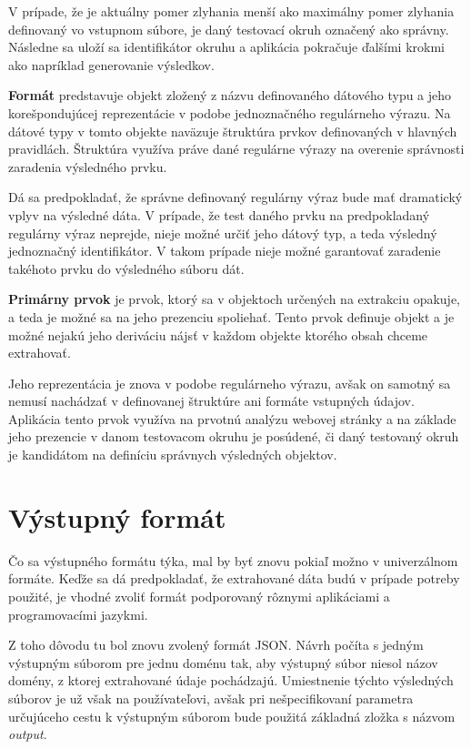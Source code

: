 V prípade, že je aktuálny pomer zlyhania menší ako maximálny pomer zlyhania definovaný vo vstupnom súbore, je daný testovací okruh označený ako správny. Následne sa uloží sa identifikátor okruhu a aplikácia pokračuje ďalšími krokmi ako napríklad generovanie výsledkov.

\bigskip

\textbf{Formát} predstavuje objekt zložený z názvu definovaného dátového typu a jeho korešpondujúcej reprezentácie v podobe jednoznačného regulárneho výrazu. Na dátové typy v tomto objekte naväzuje štruktúra prvkov definovaných v hlavných pravidlách. Štruktúra využíva práve dané regulárne výrazy na overenie správnosti zaradenia výsledného prvku.

Dá sa predpokladať, že správne definovaný regulárny výraz bude mať dramatický vplyv na výsledné dáta. V prípade, že test daného prvku na predpokladaný regulárny výraz neprejde, nieje možné určiť jeho dátový typ, a teda výsledný jednoznačný identifikátor. V takom prípade nieje možné garantovať zaradenie takéhoto prvku do výsledného súboru dát.

\newpage

\textbf{Primárny prvok} je prvok, ktorý sa v objektoch určených na extrakciu opakuje, a teda je možné sa na jeho prezenciu spoliehať. Tento prvok definuje objekt a je možné nejakú jeho deriváciu nájsť v každom objekte ktorého obsah chceme extrahovať. 

Jeho reprezentácia je znova v podobe regulárneho výrazu, avšak on samotný sa nemusí nachádzať v definovanej štruktúre ani formáte vstupných údajov. Aplikácia tento prvok využíva na prvotnú analýzu webovej stránky a na základe jeho prezencie v danom testovacom okruhu je posúdené, či daný testovaný okruh je kandidátom na definíciu správnych výsledných objektov.


\section{Výstupný formát}

Čo sa výstupného formátu týka, mal by byť znovu pokiaľ možno v univerzálnom formáte. Keďže sa dá predpokladať, že extrahované dáta budú v prípade potreby použité, je vhodné zvoliť formát podporovaný rôznymi aplikáciami a programovacími jazykmi.

Z toho dôvodu tu bol znovu zvolený formát JSON. Návrh počíta s jedným výstupným súborom pre jednu doménu tak, aby výstupný súbor niesol názov domény, z ktorej extrahované údaje pochádzajú. Umiestnenie týchto výsledných súborov je už však na používateľovi, avšak pri nešpecifikovaní parametra určujúceho cestu k výstupným súborom bude použitá základná zložka s názvom \textit{output}.

